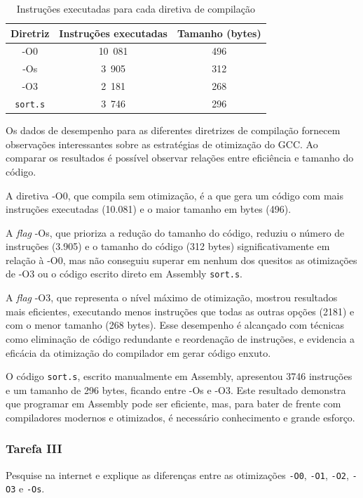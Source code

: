 \documentclass[a4paper,12pt]{article}
\newcommand{\cod}[1]{\texttt{#1}}
\begin{document}
\begin{table}[H]
\centering
\label{tab:results}
\small
\setlength{\tabcolsep}{3pt}
\begin{tabular}{@{}ccc@{}}
    \toprule
    \textbf{Diretriz} & \textbf{Instruções executadas} & \textbf{Tamanho (bytes)}\\
    \midrule
    -O0 & 10\ 081 & 496\\
    -Os & 3\ 905 & 312\\
    -O3 & 2\ 181 & 268\\
    \cod{sort.s} & 3\ 746 & 296\\
    \bottomrule
\end{tabular}
\caption{Instruções executadas para cada diretiva de compilação}
\vspace{-10pt}
\end{table}

Os dados de desempenho para as diferentes diretrizes de compilação fornecem observações interessantes sobre as estratégias de otimização do GCC. Ao comparar os resultados é possível observar relações entre eficiência e tamanho do código. 

A diretiva -O0, que compila sem otimização, é a que gera um código com mais instruções executadas (10.081) e o maior tamanho em bytes (496).

A \textit{flag} -Os, que prioriza a redução do tamanho do código, reduziu o número de instruções (3.905) e o tamanho do código (312 bytes) significativamente em relação à -O0, mas não conseguiu superar em nenhum dos quesitos as otimizações de -O3 ou o código escrito direto em Assembly \cod{sort.s}. 

A \textit{flag} -O3, que representa o nível máximo de otimização, mostrou resultados mais eficientes, executando menos instruções que todas as outras opções (2181) e com o menor tamanho (268 bytes). Esse desempenho é alcançado com técnicas como eliminação de código redundante e reordenação de instruções, e evidencia a eficácia da otimização do compilador em gerar código enxuto.

O código \cod{sort.s}, escrito manualmente em Assembly, apresentou 3746 instruções e um tamanho de 296 bytes, ficando entre -Os e -O3. Este resultado demonstra que programar em Assembly pode ser eficiente, mas, para bater de frente com compiladores modernos e otimizados, é necessário conhecimento e grande esforço.

\subsubsection{Tarefa III}
\begin{tcolorbox}[title=Enunciado, colback=blue!5!white, colframe=blue!75!black]
Pesquise na internet e explique as diferenças entre as otimizações \cod{-O0}, \cod{-O1}, \cod{-O2}, \cod{-O3} e \cod{-Os}.  
\end{tcolorbox}
\end{document}
